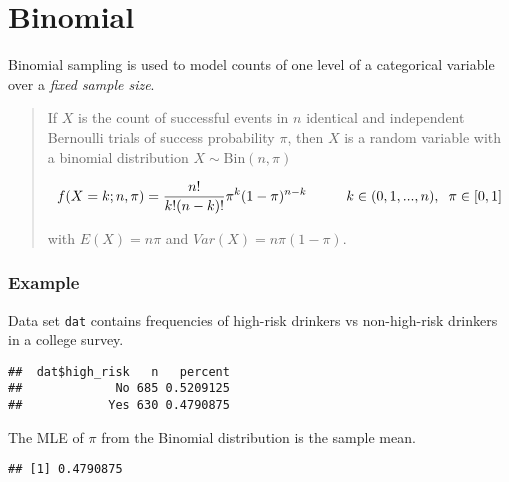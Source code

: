 \documentclass[
]{book}
\newenvironment{Shaded}{\begin{snugshade}}{\end{snugshade}}
\newcommand{\KeywordTok}[1]{\textcolor[rgb]{0.13,0.29,0.53}{\textbf{#1}}}
\newcommand{\NormalTok}[1]{#1}
\newcommand{\OperatorTok}[1]{\textcolor[rgb]{0.81,0.36,0.00}{\textbf{#1}}}
\newcommand{\StringTok}[1]{\textcolor[rgb]{0.31,0.60,0.02}{#1}}
\begin{document}
\hypertarget{binomial}{%
\section{Binomial}\label{binomial}}

Binomial sampling is used to model counts of one level of a categorical variable over a \emph{fixed sample size}.

\begin{quote}
If \(X\) is the count of successful events in \(n\) identical and independent Bernoulli trials of success probability \(\pi\), then \(X\) is a random variable with a binomial distribution \(X \sim \mathrm{Bin}(n,\pi)\)

\[f(X = k;n, \pi) = \frac{n!}{k!(n-k)!} \pi^k (1-\pi)^{n-k} \hspace{1cm} k \in (0, 1, ..., n), \hspace{2mm} \pi \in [0, 1]\]

with \(E(X)=n\pi\) and \(Var(X) = n\pi(1-\pi)\).
\end{quote}

\hypertarget{example}{%
\subsubsection*{Example}\label{example}}

Data set \texttt{dat} contains frequencies of high-risk drinkers vs non-high-risk drinkers in a college survey.

\begin{verbatim}
##  dat$high_risk   n   percent
##             No 685 0.5209125
##            Yes 630 0.4790875
\end{verbatim}

The MLE of \(\pi\) from the Binomial distribution is the sample mean.

\begin{Shaded}
\end{Shaded}

\begin{verbatim}
## [1] 0.4790875
\end{verbatim}
\end{document}
